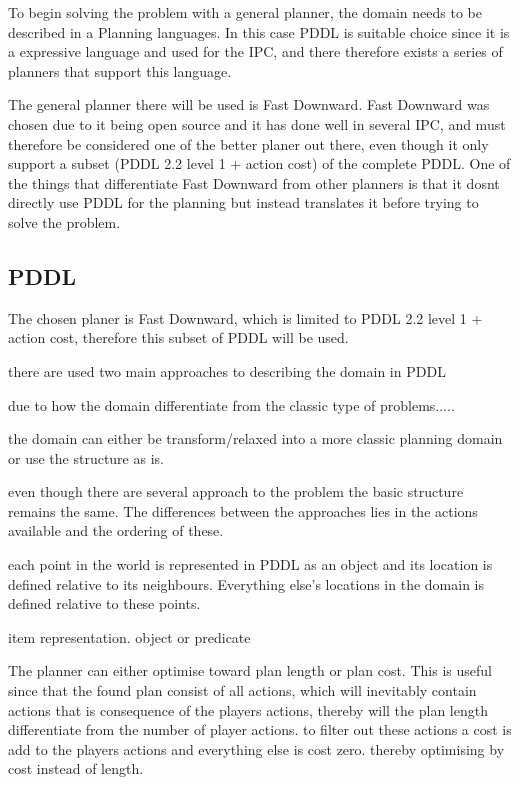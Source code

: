 	To begin solving the problem with a general planner, the domain needs to be described in a Planning languages. In this case PDDL is suitable choice since it is a expressive language and used for the IPC, and there therefore exists a series of planners that support this language.
 

	  
	
	The general planner there will be used is Fast Downward. Fast Downward was chosen due to it being open source and it has done well in several IPC, and must therefore be considered one of the better planer out there, even though it only support a subset (PDDL 2.2 level 1 + action cost) of the complete PDDL.
	One of the things that differentiate Fast Downward from other planners is that it dosnt directly use PDDL for the planning but instead translates it before trying to solve the problem. 
 
 \subsection{PDDL}
	The chosen planer is Fast Downward, which is limited to PDDL 2.2 level 1 + action cost, therefore this subset of PDDL will be used.


	
	there are used two main approaches to describing the domain in PDDL
		
	due to how the domain differentiate from the classic type of problems.....
	
	the domain can either be transform/relaxed into a more classic planning domain or use the structure as is.
	
		even though there are several approach to the problem the basic structure remains the same. The differences between the approaches lies in the actions available and the ordering of these. 
		
		each point in the world is represented in PDDL as an object and its location is defined relative to its neighbours. Everything else's locations in the domain is defined relative to these points.
		
		item representation. object or predicate

		
		
		The planner can either optimise toward plan length or plan cost. This is useful since that the found plan consist of all actions, which will inevitably contain actions that is consequence of the players actions, thereby will the plan length differentiate from the number of player actions. to filter out these actions a cost is add to the players actions and everything else is cost zero. thereby optimising by cost instead of length.
	
